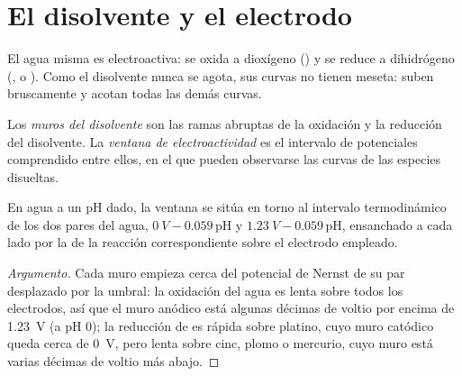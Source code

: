 \section{El disolvente y el electrodo}

El agua misma es electroactiva: se oxida a dioxígeno
() y se reduce a dihidrógeno (, o
). Como el disolvente nunca se agota, sus curvas
no tienen meseta: suben bruscamente y acotan todas las demás curvas.

\begin{definition}\label{def:b2:current-potential-curves:window}
Los \emph{muros del disolvente} son las ramas abruptas de la
oxidación y la reducción del disolvente. La \emph{ventana de
electroactividad} es el intervalo de potenciales comprendido entre ellos,
en el que pueden observarse las curvas de las especies disueltas.
\end{definition}

\begin{proposition}\label{prop:b2:current-potential-curves:window}
En agua a un pH dado, la ventana se sitúa en torno al intervalo termodinámico de los
dos pares del agua, $\qty{0}{V} - 0.059\,\mathrm{pH}$ y $\qty{1.23}{V} -
0.059\,\mathrm{pH}$, ensanchado a cada lado por la  de la
reacción correspondiente sobre el electrodo empleado.
\end{proposition}

\begin{proof}[Argumento]
Cada muro empieza cerca del potencial de Nernst de su par desplazado por la
 umbral: la oxidación del agua es lenta sobre todos los electrodos, así que
el muro anódico está algunas décimas de voltio por encima de \qty{1.23}{V} (a pH 0); la
reducción de  es rápida sobre platino, cuyo muro catódico queda cerca de
\qty{0}{V}, pero lenta sobre cinc, plomo o mercurio, cuyo muro está varias décimas de
voltio más abajo.
\end{proof}

